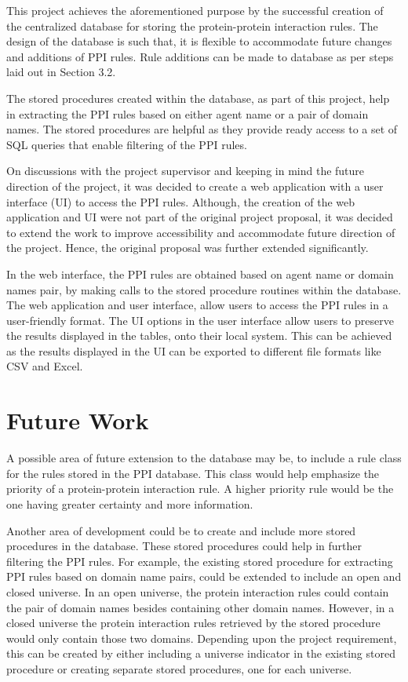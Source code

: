 \documentclass[msc,deptreport,ai]{infthesis}      %
\begin{document}
This project achieves the aforementioned purpose by the successful creation of the centralized database for storing the protein-protein interaction rules. The design of the database is such that, it is flexible to accommodate future changes and additions of PPI rules. Rule additions can be made to database as per steps laid out in Section 3.2.

The stored procedures created within the database, as part of this project, help in extracting the PPI rules based on either agent name or a pair of domain names. The stored procedures are helpful as they provide ready access to a set of SQL queries that enable filtering of the PPI rules. 

On discussions with the project supervisor and keeping in mind the future direction of the project, it was decided to create a web application with a user interface (UI) to access the PPI rules. Although, the creation of the web application and UI were not part of the original project proposal, it was decided to extend the work to improve accessibility and accommodate future direction of the project. Hence, the original proposal was further extended significantly.

In the web interface, the PPI rules are obtained based on agent name or domain names pair, by making calls to the stored procedure routines within the database. The web application and user interface, allow users to access the PPI rules in a user-friendly format. The UI options in the user interface allow users to preserve the results displayed in the tables, onto their local system. This can be achieved as the results displayed in the UI can be exported to different file formats like CSV and Excel.  
\section{Future Work}
A possible area of future extension to the database may be, to include a rule class for the rules stored in the PPI database. This class would help emphasize the priority of a protein-protein interaction rule. A higher priority rule would be the one having greater certainty and more information.

Another area of development could be to create and include more stored procedures in the database. These stored procedures could help in further filtering the PPI rules. For example, the existing stored procedure for extracting PPI rules based on domain name pairs, could be extended to include an open and closed universe. In an open universe, the protein interaction rules could contain the pair of domain names besides containing other domain names. However, in a closed universe the protein interaction rules retrieved by the stored procedure would only contain those two domains. Depending upon the project requirement, this can be created by either including a universe indicator in the existing stored procedure or creating separate stored procedures, one for each universe.
\end{document}
